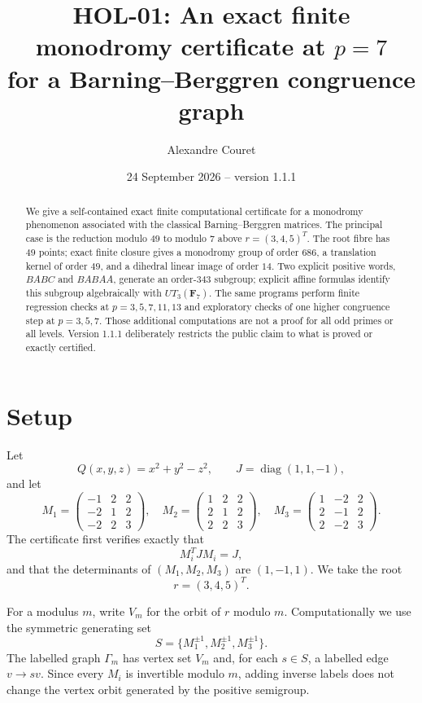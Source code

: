 \documentclass[11pt]{article}
\title{HOL-01: An exact finite monodromy certificate at $p=7$\\for a Barning--Berggren congruence graph}
\author{Alexandre Couret}
\date{24 September 2026 -- version 1.1.1}
\begin{document}
\maketitle

\begin{abstract}
We give a self-contained exact finite computational certificate for a monodromy phenomenon associated with the classical Barning--Berggren matrices. The principal case is the reduction modulo $49$ to modulo $7$ above $r=(3,4,5)^T$. The root fibre has $49$ points; exact finite closure gives a monodromy group of order $686$, a translation kernel of order $49$, and a dihedral linear image of order $14$. Two explicit positive words, $BABC$ and $BABAA$, generate an order-$343$ subgroup; explicit affine formulas identify this subgroup algebraically with $UT_3(\mathbf F_7)$. The same programs perform finite regression checks at $p=3,5,7,11,13$ and exploratory checks of one higher congruence step at $p=3,5,7$. Those additional computations are not a proof for all odd primes or all levels. Version 1.1.1 deliberately restricts the public claim to what is proved or exactly certified.
\end{abstract}

\section{Setup}
Let
\[
Q(x,y,z)=x^2+y^2-z^2,
\qquad
J=\operatorname{diag}(1,1,-1),
\]
and let
\[
M_1=\begin{pmatrix}-1&2&2\\-2&1&2\\-2&2&3\end{pmatrix},\quad
M_2=\begin{pmatrix}1&2&2\\2&1&2\\2&2&3\end{pmatrix},\quad
M_3=\begin{pmatrix}1&-2&2\\2&-1&2\\2&-2&3\end{pmatrix}.
\]
The certificate first verifies exactly that
\[
M_i^TJM_i=J,
\]
and that the determinants of $(M_1,M_2,M_3)$ are $(1,-1,1)$.  We take the root
\[
r=(3,4,5)^T.
\]

For a modulus $m$, write $V_m$ for the orbit of $r$ modulo $m$.  Computationally we use the symmetric generating set
\[
S=\{M_1^{\pm1},M_2^{\pm1},M_3^{\pm1}\}.
\]
The labelled graph $\Gamma_m$ has vertex set $V_m$ and, for each $s\in S$, a labelled edge $v\to sv$.  Since every $M_i$ is invertible modulo $m$, adding inverse labels does not change the vertex orbit generated by the positive semigroup.
\end{document}
